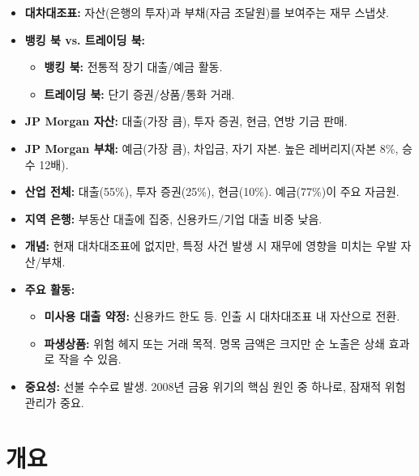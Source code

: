 \documentclass[11pt,a4paper]{article}
\begin{document}
\begin{tcolorbox}[title=\textbf{현대 은행의 재무제표 분석}]
\begin{itemize}
    \item \textbf{대차대조표:} 자산(은행의 투자)과 부채(자금 조달원)를 보여주는 재무 스냅샷.
    \item \textbf{뱅킹 북 vs. 트레이딩 북:}
    \begin{itemize}
        \item \textbf{뱅킹 북:} 전통적 장기 대출/예금 활동.
        \item \textbf{트레이딩 북:} 단기 증권/상품/통화 거래.
    \end{itemize}
    \item \textbf{JP Morgan 자산:} 대출(가장 큼), 투자 증권, 현금, 연방 기금 판매.
    \item \textbf{JP Morgan 부채:} 예금(가장 큼), 차입금, 자기 자본. 높은 레버리지(자본 8\%, 승수 12배).
    \item \textbf{산업 전체:} 대출(55\%), 투자 증권(25\%), 현금(10\%). 예금(77\%)이 주요 자금원.
    \item \textbf{지역 은행:} 부동산 대출에 집중, 신용카드/기업 대출 비중 낮음.
\end{itemize}
\end{tcolorbox}

\begin{tcolorbox}[title=\textbf{대차대조표 외 활동 (OBS)}]
\begin{itemize}
    \item \textbf{개념:} 현재 대차대조표에 없지만, 특정 사건 발생 시 재무에 영향을 미치는 우발 자산/부채.
    \item \textbf{주요 활동:}
    \begin{itemize}
        \item \textbf{미사용 대출 약정:} 신용카드 한도 등. 인출 시 대차대조표 내 자산으로 전환.
        \item \textbf{파생상품:} 위험 헤지 또는 거래 목적. 명목 금액은 크지만 순 노출은 상쇄 효과로 작을 수 있음.
    \end{itemize}
    \item \textbf{중요성:} 선불 수수료 발생. 2008년 금융 위기의 핵심 원인 중 하나로, 잠재적 위험 관리가 중요.
\end{itemize}
\end{tcolorbox}

\newpage

\newpage
\section*{개요}
\end{document}
